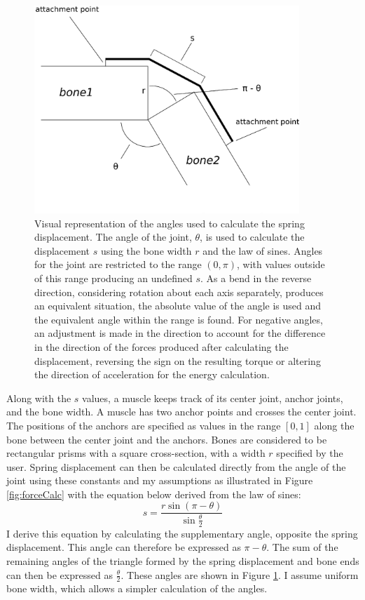 \begin{figure}[ht]
	\centering
	\includegraphics[width=10cm]{images/spring_calc/angle_diag.eps}
	\caption[Diagram of spring displacement calculation]{Visual representation of the angles used to calculate the spring displacement.  The angle of the joint, $\theta$, is used to calculate the displacement $s$ using the bone width $r$ and the law of sines.  Angles for the joint are restricted to the range $(0, \pi)$, with values outside of this range producing an undefined $s$.  As a bend in the reverse direction, considering rotation about each axis separately, produces an equivalent situation, the absolute value of the angle is used and the equivalent angle within the range is found.  For negative angles, an adjustment is made in the direction to account for the difference in the direction of the forces produced after calculating the displacement, reversing the sign on the resulting torque or altering the direction of acceleration for the energy calculation.}
	\label{fig:angleDiag}
\end{figure}

Along with the $s$ values, a muscle keeps track of its center joint, anchor joints, and the bone width.  A muscle has two anchor points and crosses the center joint.  The positions of the anchors are specified as values in the range $[0,1]$ along the bone between the center joint and the anchors.  Bones are considered to be rectangular prisms with a square cross-section, with a width $r$ specified by the user.  Spring displacement can then be calculated directly from the angle of the joint using these constants and my assumptions as illustrated in Figure \ref{fig:forceCalc} with the equation below derived from the law of sines:
\[ 
	s = \dfrac{r\sin\left(\pi - \theta \right)}{\sin\frac{\theta}{2}}
\]
I derive this equation by calculating the supplementary angle, opposite the spring displacement.  This angle can therefore be expressed as $\pi - \theta$. The sum of the remaining angles of the triangle formed by the spring displacement and bone ends can then be expressed as $\frac{\theta}{2}$.  These angles are shown in Figure \ref{fig:angleDiag}. I assume uniform bone width, which allows a simpler calculation of the angles.

